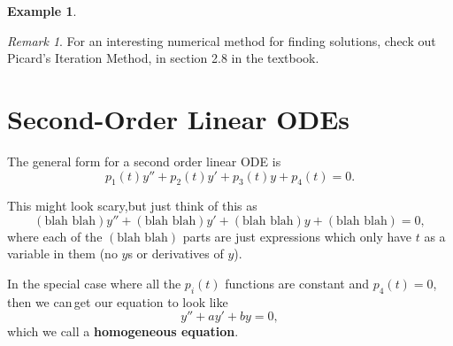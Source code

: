 \documentclass[a5paper]{article}
\theoremstyle{definition}%
\newtheorem*{example*}{Example}
\numberwithin{exercise}{section}
\theoremstyle{remark}%
\newtheorem*{remark*}{Remark}
\begin{document}
\begin{example*}
\end{example*}

\begin{remark*}
For an interesting numerical method for finding solutions, check out Picard's Iteration Method, in section 2.8 in the textbook. 
\end{remark*}

\pagebreak
\section{Second-Order Linear ODEs}

\begin{highlight}
The general form for a second order linear ODE is 
\[p_1(t)y'' + p_2(t)y' + p_3(t)y + p_4(t)=0.\]
\end{highlight}

This might look scary,but just think of this as 
\[(\text{blah blah})y'' + (\text{blah blah})y' + (\text{blah blah})y + (\text{blah blah})=0,\]
where each of the $(\text{blah blah})$ parts are just expressions which only have $t$ as a variable in them (no $y$s or derivatives of $y$).

\begin{highlight}
In the special case where all the $p_i(t)$ functions are constant and $p_4(t)=0$, then we can\footnotemark\,get our equation to look like 
\[y''+ay'+by=0,\]
which we call a \textbf{homogeneous equation}.
\end{highlight}
\end{document}
